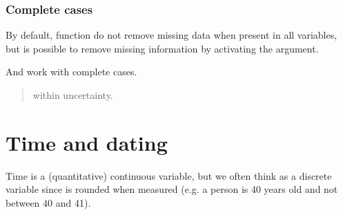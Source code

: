 \documentclass[a4paper,12pt,english]{sphinxhowto}
\begin{document}
\subsubsection{Complete cases}
\label{\detokenize{EDHVariables:complete-cases}}\label{\detokenize{EDHVariables:ccases}}
By default, function  do not remove missing data when present in all variables, but is possible to
remove missing information by activating the  argument.
\begin{quote}

\begin{sphinxVerbatim}[commandchars=\\\{\},formatcom=\footnotesize]
   
\end{sphinxVerbatim}
\end{quote}

And work with complete cases.

\begin{quote}




{\hyperref[\detokenize{Uncertainty:missing}]{}} within uncertainty.


\end{quote}



\section{Time and dating}
\label{\detokenize{Time:time-and-dating}}\label{\detokenize{Time:time}}\label{\detokenize{Time::doc}}
Time is a (quantitative) continuous variable, but we often think  as a discrete variable
since is rounded when measured (e.g. a person is 40 years old and not between 40 and 41).
\end{document}
